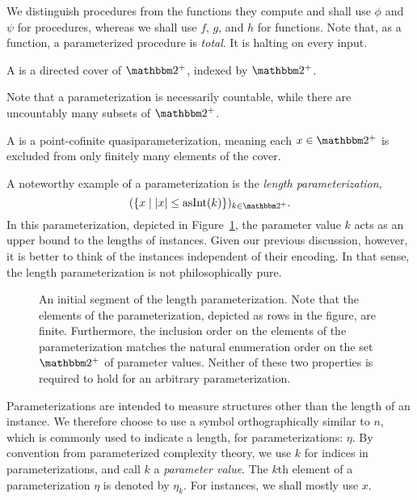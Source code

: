 We distinguish procedures from the functions they compute and shall use $\phi$ and $\psi$ for procedures, whereas we shall use $f$, $g$, and $h$ for functions. %
Note that, as a function, a parameterized procedure is \emph{total}.
It is halting on every input.

\begin{definition}
  A  is a directed cover of $\binary^+$, indexed by $\binary^+$.
\end{definition}

Note that a parameterization is necessarily countable, while there are uncountably many subsets of $\binary^+$.

\begin{definition}
  A  is a point-cofinite quasiparameterization, meaning each $x \in \binary^+$ is excluded from only finitely many elements of the cover.
\end{definition}

A noteworthy example of a parameterization is the \emph{length parameterization},
\begin{equation*}
  (\{x \st \length{x} \le \asNat(k)\})_{k \in \binary^+}.
\end{equation*}
In this parameterization, depicted in Figure~\ref{fig:length_parameterization}, the parameter value $k$ acts as an upper bound to the lengths of instances.
Given our previous discussion, however, it is better to think of the instances independent of their encoding.
In that sense, the length parameterization is not philosophically pure.
\begin{figure}
\caption{
  An initial segment of the length parameterization.
  Note that the elements of the parameterization, depicted as rows in the figure, are finite.
  Furthermore, the inclusion order on the elements of the parameterization matches the natural enumeration order on the set $\binary^+$ of parameter values.
  Neither of these two properties is required to hold for an arbitrary parameterization.
}
\label{fig:length_parameterization}
\end{figure}

Parameterizations are intended to measure structures other than the length of an instance.
We therefore choose to use a symbol orthographically similar to $n$, which is commonly used to indicate a length, for parameterizations: $\eta$.
By convention from parameterized complexity theory, we use $k$ for indices in parameterizations, and call $k$ a \emph{parameter value}.
The $k$th element of a parameterization $\eta$ is denoted by $\eta_k$.
For instances, we shall mostly use $x$.

